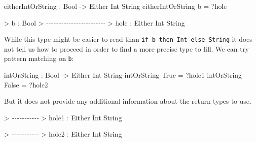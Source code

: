 \documentclass[
]{article}
\newenvironment{Shaded}{}{}
\newcommand{\CommentTok}[1]{\textcolor[rgb]{0.38,0.63,0.69}{\textit{#1}}}
\newcommand{\DataTypeTok}[1]{\textcolor[rgb]{0.56,0.13,0.00}{#1}}
\newcommand{\NormalTok}[1]{#1}
\newcommand{\OperatorTok}[1]{\textcolor[rgb]{0.40,0.40,0.40}{#1}}
\newcommand{\OtherTok}[1]{\textcolor[rgb]{0.00,0.44,0.13}{#1}}
\begin{document}
\begin{Shaded}
\begin{Highlighting}[]
\NormalTok{eitherIntOrString }\OperatorTok{:} \DataTypeTok{Bool} \OtherTok{{-}\textgreater{}} \DataTypeTok{Either} \DataTypeTok{Int} \DataTypeTok{String}
\NormalTok{eitherIntOrString b }\OtherTok{=} \OperatorTok{?}\NormalTok{hole}
\end{Highlighting}
\end{Shaded}

\begin{Shaded}
\begin{Highlighting}[]
\OperatorTok{\textgreater{}}\NormalTok{ b }\OperatorTok{:} \DataTypeTok{Bool}
\OperatorTok{\textgreater{}} \CommentTok{{-}{-}{-}{-}{-}{-}{-}{-}{-}{-}{-}{-}{-}{-}{-}{-}{-}{-}{-}{-}{-}{-}{-}{-}}
\OperatorTok{\textgreater{}}\NormalTok{ hole }\OperatorTok{:} \DataTypeTok{Either} \DataTypeTok{Int} \DataTypeTok{String}
\end{Highlighting}
\end{Shaded}

While this type might be easier to read than
\texttt{if\ b\ then\ Int\ else\ String} it does not tell us how to
proceed in order to find a more precise type to fill. We can try pattern
matching on \texttt{b}:

\begin{Shaded}
\begin{Highlighting}[]
\NormalTok{intOrString\textquotesingle{} }\OperatorTok{:} \DataTypeTok{Bool} \OtherTok{{-}\textgreater{}} \DataTypeTok{Either} \DataTypeTok{Int} \DataTypeTok{String}
\NormalTok{intOrString\textquotesingle{} }\DataTypeTok{True} \OtherTok{=} \OperatorTok{?}\NormalTok{hole1}
\NormalTok{intOrString\textquotesingle{} }\DataTypeTok{False} \OtherTok{=} \OperatorTok{?}\NormalTok{hole2}
\end{Highlighting}
\end{Shaded}

But it does not provide any additional information about the return
types to use.

\begin{Shaded}
\begin{Highlighting}[]
\OperatorTok{\textgreater{}} \CommentTok{{-}{-}{-}{-}{-}{-}{-}{-}{-}{-}{-}}
\OperatorTok{\textgreater{}}\NormalTok{ hole1 }\OperatorTok{:} \DataTypeTok{Either} \DataTypeTok{Int} \DataTypeTok{String}
\end{Highlighting}
\end{Shaded}

\begin{Shaded}
\begin{Highlighting}[]
\OperatorTok{\textgreater{}} \CommentTok{{-}{-}{-}{-}{-}{-}{-}{-}{-}{-}{-}}
\OperatorTok{\textgreater{}}\NormalTok{ hole2 }\OperatorTok{:} \DataTypeTok{Either} \DataTypeTok{Int} \DataTypeTok{String}
\end{Highlighting}
\end{Shaded}
\end{document}
